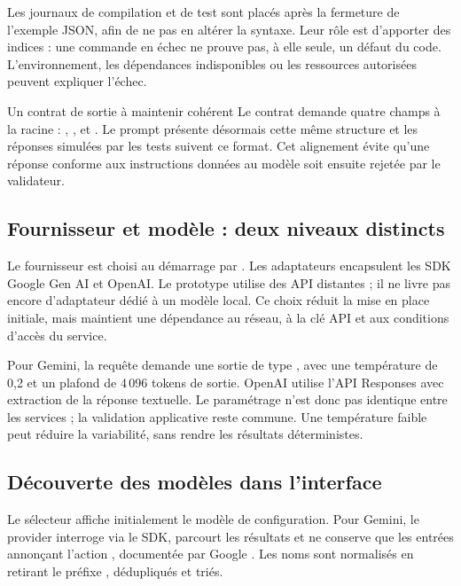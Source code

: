 Les journaux de compilation et de test sont placés après la fermeture de l'exemple JSON, afin de ne pas en altérer la syntaxe. Leur rôle est d'apporter des indices : une commande en échec ne prouve pas, à elle seule, un défaut du code. L'environnement, les dépendances indisponibles ou les ressources autorisées peuvent expliquer l'échec.

\begin{pointcle}{Un contrat de sortie à maintenir cohérent}
Le contrat demande quatre champs à la racine : , ,  et . Le prompt présente désormais cette même structure et les réponses simulées par les tests suivent ce format. Cet alignement évite qu'une réponse conforme aux instructions données au modèle soit ensuite rejetée par le validateur.
\end{pointcle}

\subsection{Fournisseur et modèle : deux niveaux distincts}
Le fournisseur est choisi au démarrage par . Les adaptateurs encapsulent les SDK Google Gen AI et OpenAI. Le prototype utilise des API distantes ; il ne livre pas encore d'adaptateur dédié à un modèle local. Ce choix réduit la mise en place initiale, mais maintient une dépendance au réseau, à la clé API et aux conditions d'accès du service.

Pour Gemini, la requête demande une sortie de type , avec une température de 0,2 et un plafond de 4\,096 tokens de sortie. OpenAI utilise l'API Responses avec extraction de la réponse textuelle. Le paramétrage n'est donc pas identique entre les services ; la validation applicative reste commune. Une température faible peut réduire la variabilité, sans rendre les résultats déterministes.

\subsection{Découverte des modèles dans l'interface}
Le sélecteur affiche initialement le modèle de configuration. Pour Gemini, le provider interroge  via le SDK, parcourt les résultats et ne conserve que les entrées annonçant l'action , documentée par Google \cite{gemini-models}. Les noms sont normalisés en retirant le préfixe , dédupliqués et triés.

